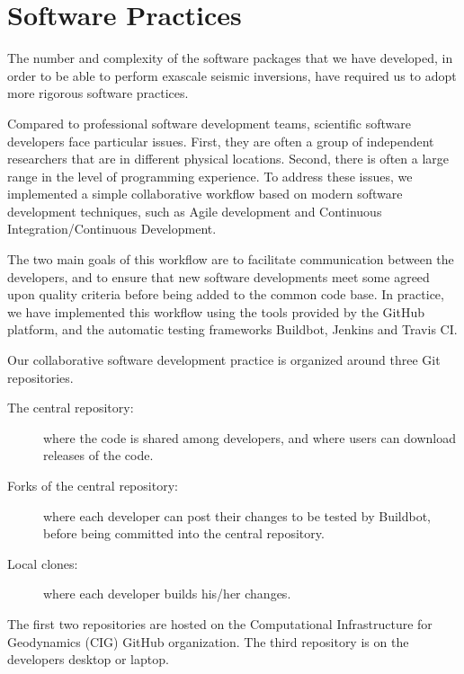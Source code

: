 
\section{Software Practices}
\label{sec:software_practices}

The number and complexity of the software packages that we have developed, in order to be able
to perform exascale seismic inversions, have required us to adopt more rigorous
software practices.

Compared to professional software development teams, scientific software
developers face particular issues.
First, they are often a group of independent researchers that are in different
physical locations.
Second, there is often a large range in the level of programming
experience.
To address these issues, we implemented a simple
collaborative workflow based on modern software development techniques, such as
Agile
development and Continuous Integration/Continuous Development.

The two main goals of this workflow are to facilitate communication between
the developers, and to ensure that new software developments meet some agreed
upon quality criteria before being added to the common code base.
In practice, we have implemented this workflow using the tools provided by the
GitHub platform, and the automatic testing frameworks Buildbot, Jenkins and Travis CI.

Our collaborative
software development practice
is organized around three Git repositories.
\begin{description}
\item[The central repository:] where the code is shared among developers, and
where users can download releases of the code.
\item[Forks of the central repository:] where each developer can post their
changes to
be tested by Buildbot, before being committed into the central
repository.
\item[Local clones:] where each developer builds his/her changes.
\end{description}
The first two repositories are hosted on the Computational Infrastructure for
Geodynamics (CIG) GitHub organization. The third repository is on the
developers desktop or laptop.



